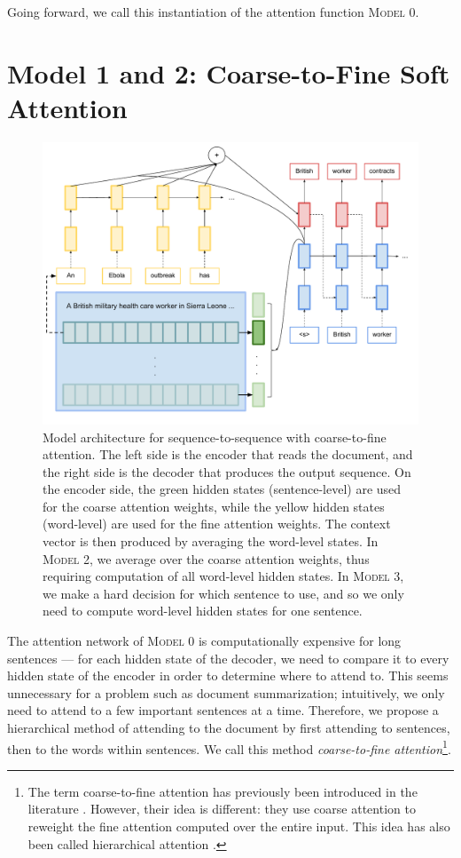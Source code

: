 \documentclass[12pt]{report}
\begin{document}
Going forward, we call this instantiation of the attention function \textsc{Model 0}.


\section{Model 1 and 2: Coarse-to-Fine Soft Attention}

\begin{figure}
\includegraphics[width=\textwidth]{images/coarse_to_fine.pdf}
\caption[Coarse-to-Fine Attention Model]{Model architecture for sequence-to-sequence with coarse-to-fine attention. The left side is the encoder that reads the document, and the right side is the decoder that produces the output sequence. On the encoder side, the green hidden states (sentence-level) are used for the coarse attention weights, while the yellow hidden states (word-level) are used for the fine attention weights. The context vector is then produced by averaging the word-level states. In \textsc{Model 2}, we average over the coarse attention weights, thus requiring computation of all word-level hidden states. In \textsc{Model 3}, we make a hard decision for which sentence to use, and so we only need to compute word-level hidden states for one sentence.}
\label{fig:coarsetofine}
\end{figure}

The attention network of \textsc{Model 0} is computationally expensive for long sentences --- for each hidden state of the decoder, we need to compare it to every hidden state of the encoder in order to determine where to attend to.
This seems unnecessary for a problem such as document summarization; intuitively, we only need to attend to a few important sentences at a time. Therefore, we propose a hierarchical method of attending to the document by first attending to sentences, then to the words within sentences. We call this method \emph{coarse-to-fine attention}\footnote{The term coarse-to-fine attention has previously been introduced in the literature \citep{mei2016}. However, their idea is different: they use coarse attention to reweight the fine attention computed over the entire input. This idea has also been called hierarchical attention \citep{nallapati2016seq2seq}.}.
\end{document}
